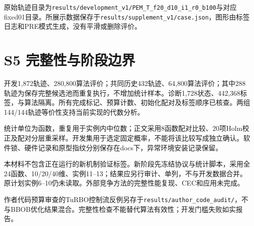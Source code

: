 \documentclass[11pt,a4paper]{article}
\begin{document}
原始轨迹目录为\texttt{results/development\_v1/PEM\_T\_f20\_d10\_i1\_r0\_b100}与对应fixed01目录。所展示数据保存于\texttt{results/supplement\_v1/case.json}，图形由标签日志和PRE模式生成，没有平滑或删除评价。

\hypertarget{s5-ux5b8cux6574ux6027ux4e0eux9636ux6bb5ux8fb9ux754c}{%
\section{S5
完整性与阶段边界}\label{s5-ux5b8cux6574ux6027ux4e0eux9636ux6bb5ux8fb9ux754c}}

开发1,872轨迹、280,800算法评价；共同历史432轨迹、64,800算法评价；其中288轨迹为保存完整候选池而重复执行，不增加统计样本。诊断1,728状态、442,368标签，与算法隔离。所有完成标记、预算计数、初始化配对及标签顺序已核查。两组144/144轨迹等价性支持当前实现的代数分析。

统计单位为函数，重复用于实例内中位数；正文采用8函数配对比较、20项Holm校正及配对分层重采样。开发集用于选定固定概率，不能将该比较写成独立确认。软件锁、硬件记录和原型指纹分别保存在docs下，异常环境安装记录保留。

本材料不包含正在运行的新机制验证标签。新阶段先冻结协议与统计脚本，采用全24函数、10/20/40维、实例11--13；结果应另行审计、单列，不与开发数据合并。原计划实例6--10仍未读取。外部竞争方法的完整性能复现、CEC和应用未完成。

作者代码预算审查的TuRBO控制流反例另存于\texttt{results/author\_code\_audit/}，不与BBOB优化结果混合。完整性检查不能替代算法有效性；开发门槛失败如实报告。
\end{document}
